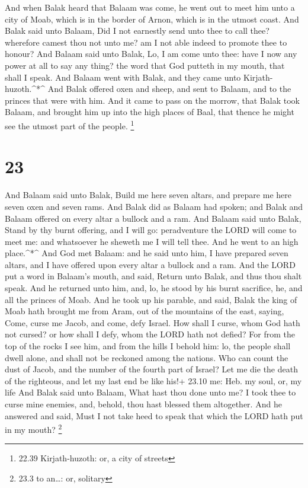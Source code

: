  And when Balak heard that Balaam was come, he went out to
meet him unto a city of Moab, which is in the border of Arnon, which is
in the utmost coast.  And Balak said unto Balaam, Did I not
earnestly send unto thee to call thee? wherefore camest thou not unto
me? am I not able indeed to promote thee to honour?  And
Balaam said unto Balak, Lo, I am come unto thee: have I now any power at
all to say any thing? the word that God putteth in my mouth, that shall
I speak.  And Balaam went with Balak, and they came unto
Kirjath-huzoth.\^{}*\^{}  And Balak offered oxen and sheep,
and sent to Balaam, and to the princes that were with him. 
And it came to pass on the morrow, that Balak took Balaam, and brought
him up into the high places of Baal, that thence he might see the utmost
part of the people. \footnote{22.39 Kirjath-huzoth: or, a city of
  streets}

\hypertarget{section-22}{%
\section{23}\label{section-22}}

 And Balaam said unto Balak, Build me here seven altars, and
prepare me here seven oxen and seven rams.  And Balak did as
Balaam had spoken; and Balak and Balaam offered on every altar a bullock
and a ram.  And Balaam said unto Balak, Stand by thy burnt
offering, and I will go: peradventure the LORD will come to meet me: and
whatsoever he sheweth me I will tell thee. And he went to an high
place.\^{}*\^{}  And God met Balaam: and he said unto him, I
have prepared seven altars, and I have offered upon every altar a
bullock and a ram.  And the LORD put a word in Balaam's
mouth, and said, Return unto Balak, and thus thou shalt speak.
 And he returned unto him, and, lo, he stood by his burnt
sacrifice, he, and all the princes of Moab.  And he took up
his parable, and said, Balak the king of Moab hath brought me from Aram,
out of the mountains of the east, saying, Come, curse me Jacob, and
come, defy Israel.  How shall I curse, whom God hath not
cursed? or how shall I defy, whom the LORD hath not defied? 
For from the top of the rocks I see him, and from the hills I behold
him: lo, the people shall dwell alone, and shall not be reckoned among
the nations.  Who can count the dust of Jacob, and the
number of the fourth part of Israel? Let me die the death of the
righteous, and let my last end be like his!+ 23.10 me: Heb. my soul, or,
my life  And Balak said unto Balaam, What hast thou done
unto me? I took thee to curse mine enemies, and, behold, thou hast
blessed them altogether.  And he answered and said, Must I
not take heed to speak that which the LORD hath put in my mouth?
\footnote{23.3 to an\ldots: or, solitary}

